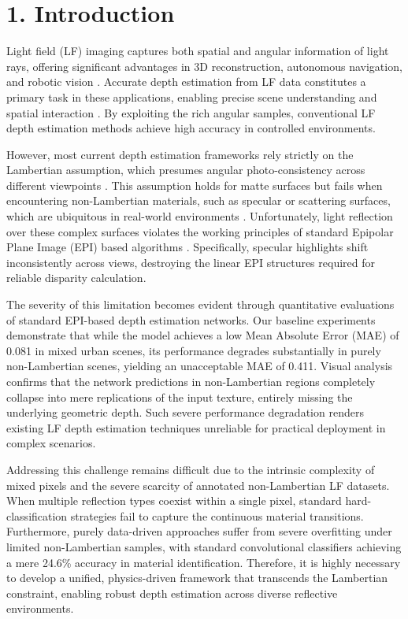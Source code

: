 \section{1. Introduction}

Light field (LF) imaging captures both spatial and angular information of light rays, offering significant advantages in 3D reconstruction, autonomous navigation, and robotic vision \cite{lightfieldimaging3Dreconst}. Accurate depth estimation from LF data constitutes a primary task in these applications, enabling precise scene understanding and spatial interaction \cite{depthestimationsceneunderst}. By exploiting the rich angular samples, conventional LF depth estimation methods achieve high accuracy in controlled environments.

However, most current depth estimation frameworks rely strictly on the Lambertian assumption, which presumes angular photo-consistency across different viewpoints \cite{Lambertianassumptionphotoco}. This assumption holds for matte surfaces but fails when encountering non-Lambertian materials, such as specular or scattering surfaces, which are ubiquitous in real-world environments \cite{nonLambertianmaterialsspecu}. Unfortunately, light reflection over these complex surfaces violates the working principles of standard Epipolar Plane Image (EPI) based algorithms \cite{EpipolarPlaneImageEPI}. Specifically, specular highlights shift inconsistently across views, destroying the linear EPI structures required for reliable disparity calculation.

The severity of this limitation becomes evident through quantitative evaluations of standard EPI-based depth estimation networks. Our baseline experiments demonstrate that while the model achieves a low Mean Absolute Error (MAE) of 0.081 in mixed urban scenes, its performance degrades substantially in purely non-Lambertian scenes, yielding an unacceptable MAE of 0.411. Visual analysis confirms that the network predictions in non-Lambertian regions completely collapse into mere replications of the input texture, entirely missing the underlying geometric depth. Such severe performance degradation renders existing LF depth estimation techniques unreliable for practical deployment in complex scenarios.

Addressing this challenge remains difficult due to the intrinsic complexity of mixed pixels and the severe scarcity of annotated non-Lambertian LF datasets. When multiple reflection types coexist within a single pixel, standard hard-classification strategies fail to capture the continuous material transitions. Furthermore, purely data-driven approaches suffer from severe overfitting under limited non-Lambertian samples, with standard convolutional classifiers achieving a mere 24.6\% accuracy in material identification. Therefore, it is highly necessary to develop a unified, physics-driven framework that transcends the Lambertian constraint, enabling robust depth estimation across diverse reflective environments.


